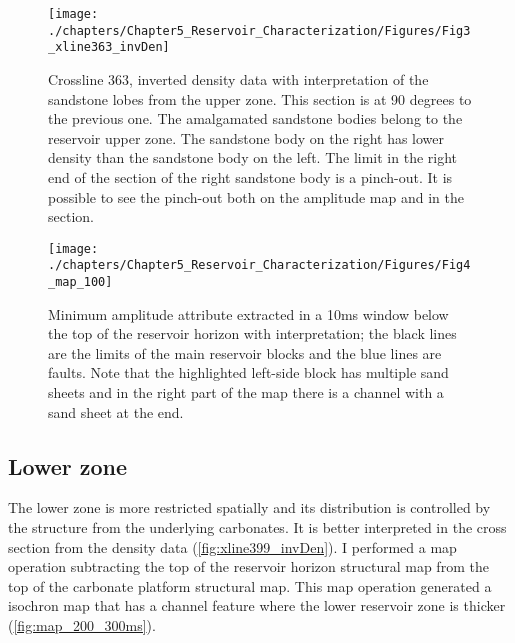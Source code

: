 \begin{figure}[hbtp]
	\begin{center}
	\texttt{[image: ./chapters/Chapter5\_Reservoir\_Characterization/Figures/Fig3\_xline363\_invDen]}
			\caption[Crossline 363, inverted density data with interpretation of the sand sheets from the upper zone.]{Crossline 363, inverted density data with interpretation of the sandstone lobes from the upper zone. This section is at 90 degrees to the previous one. The amalgamated sandstone bodies belong to the reservoir upper zone. The sandstone body on the right has lower density than the sandstone body on the left. The limit in the right end of the section of the right sandstone body is a pinch-out. It is possible to see the pinch-out both on the amplitude map and in the section. }
			\label{fig:Fig2_xline363_invDen}
		\end{center}
	\end{figure}	
	

\begin{figure}[hbtp]
	\begin{center}
	\texttt{[image: ./chapters/Chapter5\_Reservoir\_Characterization/Figures/Fig4\_map\_100]}
			\caption[Minimum amplitude attribute extracted in a 10ms window below the top of the reservoir horizon with interpretation; the black lines are the limits of the main reservoir blocks and the blue lines are  faults.]{Minimum amplitude attribute extracted in a 10ms window below the top of the reservoir horizon with interpretation; the black lines are the limits of the main reservoir blocks and the blue lines are faults. Note that the highlighted left-side block has multiple sand sheets and in the right part of the map there is a channel with a sand sheet at the end.}
			\label{fig:Fig3_map_100}
		\end{center}
	\end{figure}


\subsection{Lower zone}


The lower zone is more restricted spatially and its distribution is controlled by the structure from the underlying carbonates. It is better interpreted in the cross section from the density data (\ref{fig:xline399_invDen}). I performed a map operation subtracting the top of the reservoir horizon structural map from the top of the carbonate platform structural map. This map operation generated a isochron map that has a channel feature where the lower reservoir zone is thicker (\ref{fig:map_200_300ms}). 

